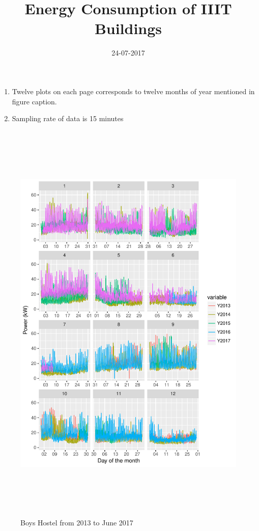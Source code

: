 \documentclass[11pt, oneside]{article}   	%
\title{Energy Consumption of IIIT Buildings}
\author{}
\date{24-07-2017}
\begin{document}
\maketitle
\begin{enumerate}
\item Twelve plots on each page corresponds to twelve months of year mentioned in figure caption.
\item Sampling rate of data is 15 minutes
\end{enumerate}
\begin{figure}
\includegraphics[width=30cm,height=20cm,keepaspectratio]{boys_hostel.pdf}
\caption{Boys Hostel from 2013 to June 2017}
\end{figure}
\end{document}
